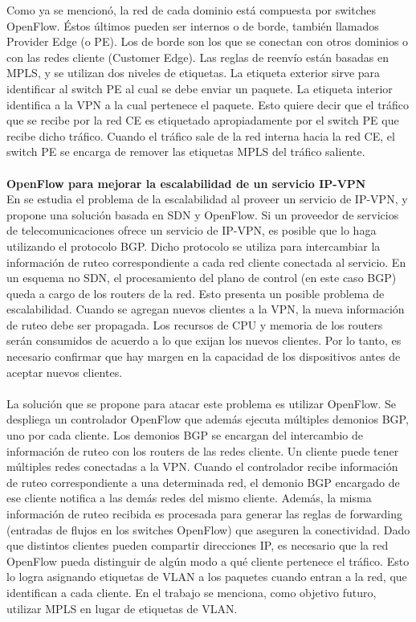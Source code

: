 Como ya se mencionó, la red de cada dominio está compuesta por switches OpenFlow. Éstos últimos pueden ser internos o de borde, también llamados Provider Edge (o PE). Los de borde son los que se conectan con otros dominios o con las redes cliente (Customer Edge). Las reglas de reenvío están basadas en MPLS, y se utilizan dos niveles de etiquetas. La etiqueta exterior sirve para identificar al switch PE al cual se debe enviar un paquete. La etiqueta interior identifica a la VPN a la cual pertenece el paquete. Esto quiere decir que el tráfico que se recibe por la red CE es etiquetado apropiadamente por el switch PE que recibe dicho tráfico. Cuando el tráfico sale de la red interna hacia la red CE, el switch PE se encarga de remover las etiquetas MPLS del tráfico saliente. \\ \\
\textbf{OpenFlow para mejorar la escalabilidad de un servicio IP-VPN} \\
En \cite{ip-vpn-bgp-sdn} se estudia el problema de la escalabilidad al proveer un servicio de IP-VPN, y propone una solución basada en SDN y OpenFlow. Si un proveedor de servicios de telecomunicaciones ofrece un servicio de IP-VPN, es posible que lo haga utilizando el protocolo BGP. Dicho protocolo se utiliza para intercambiar la información de ruteo correspondiente a cada red cliente conectada al servicio. En un esquema no SDN, el procesamiento del plano de control (en este caso BGP) queda a cargo de los routers de la red. Esto presenta un posible problema de escalabilidad. Cuando se agregan nuevos clientes a la VPN, la nueva información de ruteo debe ser propagada. Los recursos de CPU y memoria de los routers serán consumidos de acuerdo a lo que exijan los nuevos clientes. Por lo tanto, es necesario confirmar que hay margen en la capacidad de los dispositivos antes de aceptar nuevos clientes. \\ \\
La solución que se propone para atacar este problema es utilizar OpenFlow. Se despliega un controlador OpenFlow que además ejecuta múltiples demonios BGP, uno por cada cliente. Los demonios BGP se encargan del intercambio de información de ruteo con los routers de las redes cliente. Un cliente puede tener múltiples redes conectadas a la VPN. Cuando el controlador recibe información de ruteo correspondiente a una determinada red, el demonio BGP encargado de ese cliente notifica a las demás redes del mismo cliente. Además, la misma información de ruteo recibida es procesada para generar las reglas de forwarding (entradas de flujos en los switches OpenFlow) que aseguren la conectividad. Dado que distintos clientes pueden compartir direcciones IP, es necesario que la red OpenFlow pueda distinguir de algún modo a qué cliente pertenece el tráfico. Esto lo logra asignando etiquetas de VLAN a los paquetes cuando entran a la red, que identifican a cada cliente. En el trabajo se menciona, como objetivo futuro, utilizar MPLS en lugar de etiquetas de VLAN. \\ \\
